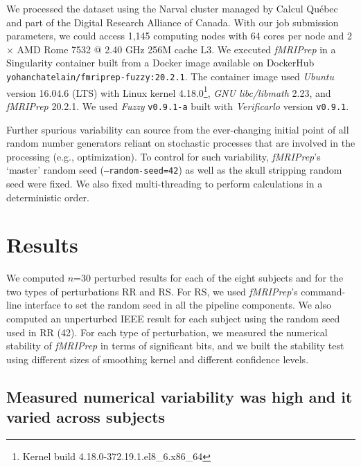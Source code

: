 \documentclass[lettersize,journal]{IEEEtran}
\newcommand{\fmriprep}{\emph{fMRIPrep}\xspace}
\begin{document}
We processed the dataset using the Narval cluster managed by Calcul Qu\'ebec
and part of the Digital Research Alliance of Canada. With our job submission
parameters, we could access 1,145 computing nodes with 64 cores per node and 2
$\times$ AMD Rome 7532 @ 2.40 GHz 256M cache L3. We executed \fmriprep in a
Singularity container built from a Docker image available on DockerHub
\texttt{yohanchatelain/fmriprep-fuzzy:20.2.1}.
The container image used \emph{Ubuntu} version 16.04.6 (LTS) with Linux kernel
4.18.0\footnote{Kernel build 4.18.0-372.19.1.el8\_6.x86\_64}, \emph{GNU
  libc/libmath} 2.23, and \fmriprep 20.2.1. We used \emph{Fuzzy}
\texttt{v0.9.1-a} built with \emph{Verificarlo} version \texttt{v0.9.1}.

Further spurious variability can source from the ever-changing initial point of
all random number generators reliant on stochastic processes that are involved
in the processing (e.g., optimization). To control for such variability,
\fmriprep's `master' random seed (\texttt{--random-seed=42}) as well as the
skull stripping random seed were fixed. We also fixed multi-threading to
perform calculations in a deterministic order.

\section{Results}

We computed $n$=30 perturbed results for each of the eight subjects and for the
two types of perturbations RR and RS. For RS, we used \fmriprep's command-line
interface to set the random seed in all the pipeline components. We also
computed an unperturbed IEEE result for each subject using the random seed used
in RR (42). For each type of perturbation, we measured the numerical stability
of \fmriprep in terms of significant bits, and we built the stability test
using different sizes of smoothing kernel and different confidence levels.

\subsection{Measured numerical variability was high and it varied across subjects}
\end{document}
